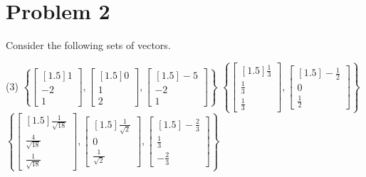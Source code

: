 \documentclass[letter,11pt]{article}
\theoremstyle{definition}
\begin{document}
\section{Problem 2}

Consider the following sets of vectors.

\begin{tasks}(3)
    \task $\left\{\begin{bmatrix}[1.5] 1 \\ -2 \\ 1 \end{bmatrix}, \begin{bmatrix}[1.5] 0 \\ 1 \\ 2 \end{bmatrix}, \begin{bmatrix}[1.5] -5 \\ -2 \\ 1 \end{bmatrix}\right\}$
    \task $\left\{\begin{bmatrix}[1.5] \frac{1}{3} \\ \frac{1}{3} \\ \frac{1}{3} \end{bmatrix}, \begin{bmatrix}[1.5] -\frac{1}{2} \\ 0 \\ \frac{1}{2} \end{bmatrix}\right\}$
    \task $\left\{\begin{bmatrix}[1.5] \frac{1}{\sqrt{18}} \\ \frac{4}{\sqrt{18}} \\ \frac{1}{\sqrt{18}} \end{bmatrix}, \begin{bmatrix}[1.5] \frac{1}{\sqrt{2}} \\ 0 \\ \frac{1}{\sqrt{2}} \end{bmatrix}, \begin{bmatrix}[1.5] -\frac{2}{3} \\ \frac{1}{3} \\ -\frac{2}{3} \end{bmatrix}\right\}$
\end{tasks}
\end{document}
